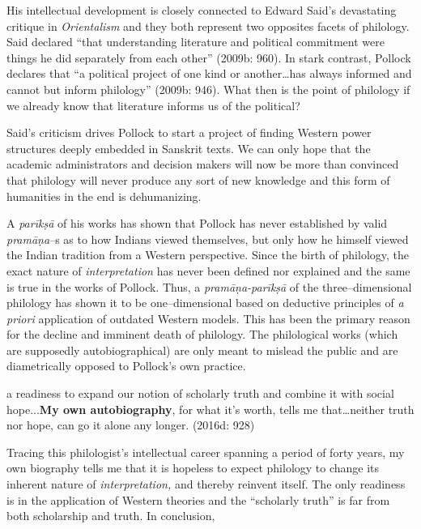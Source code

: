 His intellectual development is closely connected to Edward Said’s devastating critique in \textit{Orientalism} and they both represent two opposites facets of philology. Said declared “that understanding literature and political commitment were things he did separately from each other” (2009b: 960). In stark contrast, Pollock declares that “a political project of one kind or another…has always informed and cannot but inform philology” (2009b: 946). What then is the point of philology if we already know that literature informs us of the political?

Said’s criticism drives Pollock to start a project of finding Western power structures deeply embedded in Sanskrit texts. We can only hope that the academic administrators and decision makers will now be more than convinced that philology will never produce any sort of new knowledge and this form of humanities in the end is dehumanizing.

A \textit{parīkṣā} of his works has shown that Pollock has never established by valid \textit{pramāṇa}–s as to how Indians viewed themselves, but only how he himself viewed the Indian tradition from a Western perspective. Since the birth of philology, the exact nature of \textit{interpretation} has never been defined nor explained and the same is true in the works of Pollock. Thus, a \textit{pramāṇa-parīkṣā} of the three–dimensional philology has shown it to be one–dimensional based on deductive principles of \textit{a priori} application of outdated Western models. This has been the primary reason for the decline and imminent death of philology. The philological works (which are supposedly autobiographical) are only meant to mislead the public and are diametrically opposed to Pollock’s own practice.

\begin{myquote}
a readiness to expand our notion of scholarly truth and combine it with social hope...\textbf{My own autobiography}, for what it’s worth, tells me that…neither truth nor hope, can go it alone any longer. (2016d: 928)
\end{myquote}

\newpage

Tracing this philologist’s intellectual career spanning a period of forty years, my own biography tells me that it is hopeless to expect philology to change its inherent nature of \textit{interpretation,} and thereby reinvent itself. The only readiness is in the application of Western theories and the “scholarly truth” is far from both scholarship and truth. In conclusion,

